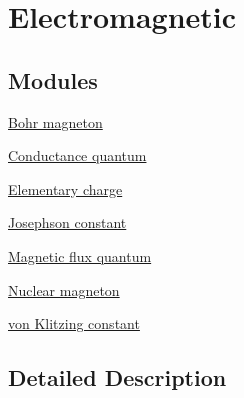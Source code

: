 \hypertarget{group___n_i_s_t_const-_electromagnetic}{}\section{Electromagnetic}
\label{group___n_i_s_t_const-_electromagnetic}
\subsection*{Modules}
\begin{DoxyCompactItemize}
\item 
\hyperlink{group___n_i_s_t_const-_bohr_magneton}{Bohr magneton}
\item 
\hyperlink{group___n_i_s_t_const-_conductance_quantum}{Conductance quantum}
\item 
\hyperlink{group___n_i_s_t_const-_elementary_charge}{Elementary charge}
\item 
\hyperlink{group___n_i_s_t_const-_josephson_constant}{Josephson constant}
\item 
\hyperlink{group___n_i_s_t_const-_magnetic_flux_quantum}{Magnetic flux quantum}
\item 
\hyperlink{group___n_i_s_t_const-_nuclear_magneton}{Nuclear magneton}
\item 
\hyperlink{group___n_i_s_t_const-von_klitzing_constant}{von Klitzing constant}
\end{DoxyCompactItemize}


\subsection{Detailed Description}
